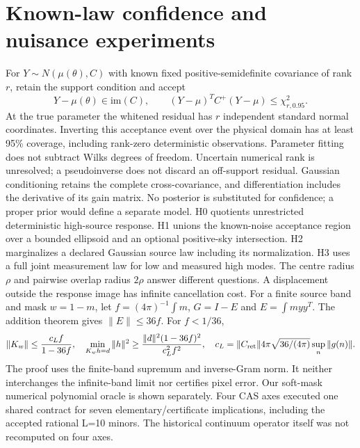 \documentclass[11pt]{article}
\begin{document}
\section{Known-law confidence and nuisance experiments}
For $Y\sim N(\mu(\theta),C)$ with known fixed positive-semidefinite covariance of rank $r$, retain the support condition and accept
\begin{equation}Y-\mu(\theta)\in\mathrm{im}(C),\qquad (Y-\mu)^TC^+(Y-\mu)\leq\chi^2_{r,0.95}.\end{equation}
At the true parameter the whitened residual has $r$ independent standard normal coordinates. Inverting this acceptance event over the physical domain has at least 95\% coverage, including rank-zero deterministic observations. Parameter fitting does not subtract Wilks degrees of freedom. Uncertain numerical rank is unresolved; a pseudoinverse does not discard an off-support residual. Gaussian conditioning retains the complete cross-covariance, and differentiation includes the derivative of its gain matrix. No posterior is substituted for confidence; a proper prior would define a separate model.
H0 quotients unrestricted deterministic high-source response. H1 unions the known-noise acceptance region over a bounded ellipsoid and an optional positive-sky intersection. H2 marginalizes a declared Gaussian source law including its normalization. H3 uses a full joint measurement law for low and measured high modes. The centre radius $\rho$ and pairwise overlap radius $2\rho$ answer different questions. A displacement outside the response image has infinite cancellation cost.
For a finite source band and mask $w=1-m$, let $f=(4\pi)^{-1}\int m$, $G=I-E$ and $E=\int myy^T$. The addition theorem gives $\|E\|\leq36f$. For $f<1/36$,
\begin{equation}\|K_w\|\leq\frac{c_Lf}{1-36f},\quad \min_{K_wh=d}\|h\|^2\geq\frac{\|d\|^2(1-36f)^2}{c_L^2f^2},\quad c_L=\|C_{\rm ret}\|4\pi\sqrt{36/(4\pi)}\sup_n\|g(n)\|.\end{equation}
The proof uses the finite-band supremum and inverse-Gram norm. It neither interchanges the infinite-band limit nor certifies pixel error. Our soft-mask numerical polynomial oracle is shown separately. Four CAS axes executed one shared contract for seven elementary/certificate implications, including the accepted rational L=10 minors. The historical continuum operator itself was not recomputed on four axes.
\end{document}
